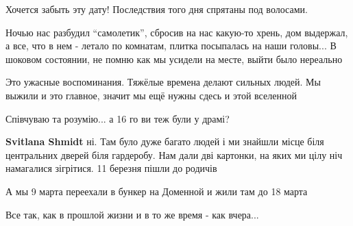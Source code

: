  
 
 
 
 

\qqSecCmt


Хочется забыть эту дату! Последствия того дня спрятаны под волосами.

Ночью нас разбудил \enquote{самолетик}, сбросив на нас какую-то хрень, дом выдержал, а
все, что в нем - летало по комнатам, плитка посыпалась на наши головы... В шоковом
состоянии, не помню как мы усидели на месте, выйти было нереально


Это ужасные воспоминания. Тяжёлые времена делают сильных людей. Мы выжили и это
главное, значит мы ещё нужны сдесь и этой вселенной 🌌


Співчуваю та розумію... а 16 го ви теж були у драмі?

\begin{itemize} %
\textbf{Svitlana Shmidt} ні. Там було дуже багато людей і ми знайшли місце біля центральних дверей біля гардеробу. Нам дали дві картонки, на яких ми цілу ніч намагалися зігрітися. 11 березня пішли до родичів
\end{itemize} %


А мы 9 марта переехали в бункер на Доменной и жили там до 18 марта


Все так, как в прошлой жизни и в то же время - как вчера...
